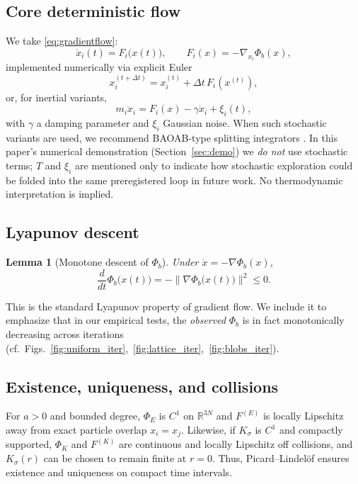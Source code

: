 \documentclass[11pt]{article}
\newtheorem{lemma}{Lemma}
\begin{document}
\subsection{Core deterministic flow}
We take \eqref{eq:gradientflow}:
\begin{equation}
    \dot{x}_i(t) = F_i\big(x(t)\big),
    \qquad
    F_i(x) = -\nabla_{x_i}\Phi_b(x),
\end{equation}
implemented numerically via explicit Euler
\begin{equation}
    x_i^{(t+\Delta t)} = x_i^{(t)} + \Delta t \, F_i\left(x^{(t)}\right),
\end{equation}
or, for inertial variants,
\begin{equation}
    m_i \ddot{x}_i = F_i(x) - \gamma \dot{x}_i + \xi_i(t),
\end{equation}
with $\gamma$ a damping parameter and $\xi_i$ Gaussian noise.
When such stochastic variants are used, we recommend BAOAB-type splitting integrators \cite{baoab}.
In this paper’s numerical demonstration (Section~\ref{sec:demo}) we \emph{do not} use stochastic terms; $T$ and $\xi_i$ are mentioned only to indicate how stochastic exploration could be folded into the same preregistered loop in future work. No thermodynamic interpretation is implied.

\subsection{Lyapunov descent}
\begin{lemma}[Monotone descent of $\Phi_b$]\label{lem:lyapunov}
Under $\dot{x}=-\nabla\Phi_b(x)$,
\begin{equation}
    \frac{d}{dt}\Phi_b\big(x(t)\big)
    = -\|\nabla \Phi_b\big(x(t)\big)\|^2
    \le 0.
\end{equation}
\end{lemma}
This is the standard Lyapunov property of gradient flow.  We include it to emphasize that in our empirical tests, the \emph{observed} $\Phi_b$ is in fact monotonically decreasing across iterations (cf.\ Figs.~\ref{fig:uniform_iter},~\ref{fig:lattice_iter},~\ref{fig:blobs_iter}).

\subsection{Existence, uniqueness, and collisions}
For $a>0$ and bounded degree, $\Phi_E$ is $C^1$ on $\mathbb{R}^{3N}$ and $F^{(E)}$ is locally Lipschitz away from exact particle overlap $x_i=x_j$.
Likewise, if $K_\sigma$ is $C^1$ and compactly supported, $\Phi_K$ and $F^{(K)}$ are continuous and locally Lipschitz off collisions, and $K_\sigma(r)$ can be chosen to remain finite at $r=0$.
Thus, Picard--Lindel\"of ensures existence and uniqueness on compact time intervals.
\end{document}

